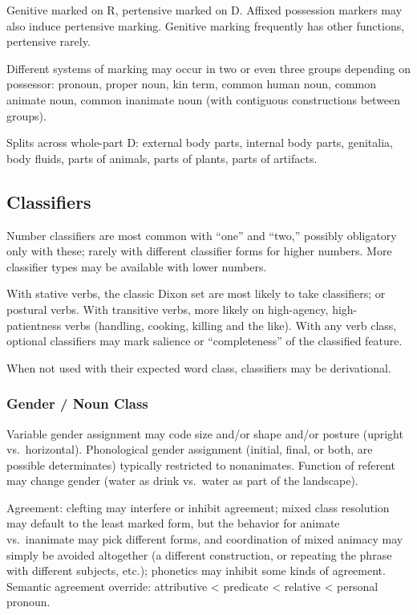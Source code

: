 \documentclass[11pt]{article}
\begin{document}
Genitive marked on R, pertensive marked on D.  Affixed possession
markers may also induce pertensive marking.  Genitive marking
frequently has other functions, pertensive rarely.

Different systems of marking may occur in two or even three groups
depending on possessor: pronoun, proper noun, kin term, common human
noun, common animate noun, common inanimate noun (with contiguous
constructions between groups).

Splits across whole-part D: external body parts, internal body parts,
genitalia, body fluids, parts of animals, parts of plants, parts of
artifacts. 

\subsection{Classifiers}
Number classifiers are most common with ``one'' and ``two,'' possibly
obligatory only with these; rarely with different classifier forms for
higher numbers.  More classifier types may be available with lower
numbers.

With stative verbs, the classic Dixon set are most likely to take
classifiers; or postural verbs.  With transitive verbs, more likely on
high-agency, high-patientness verbs (handling, cooking, killing and
the like).  With any verb class, optional classifiers may mark
salience or ``completeness'' of the classified feature.

When not used with their expected word class, classifiers may be
derivational.

\subsubsection{Gender / Noun Class}
Variable gender assignment may code size and/or shape and/or posture
(upright vs.\ horizontal).  Phonological gender assignment (initial,
final, or both, are possible determinates) typically restricted to
nonanimates.  Function of referent may change gender (water as drink
vs.\ water as part of the landscape).

Agreement: clefting may interfere or inhibit agreement; mixed class
resolution may default to the least marked form, but the behavior for
animate vs.\ inanimate may pick different forms, and coordination of
mixed animacy may simply be avoided altogether (a different
construction, or repeating the phrase with different subjects, etc.);
phonetics may inhibit some kinds of agreement.  Semantic agreement
override: attributive < predicate < relative < personal pronoun.
\end{document}
